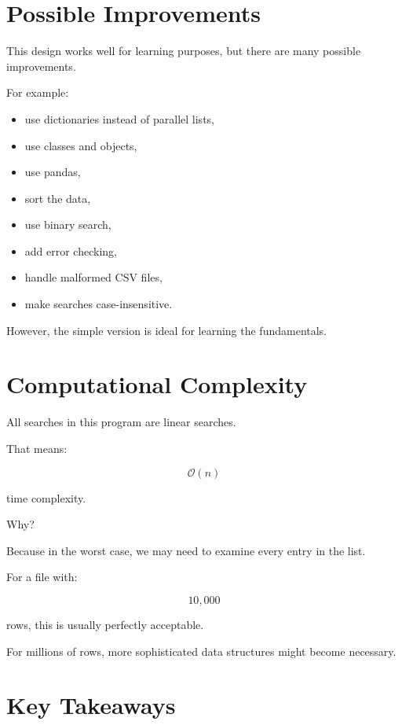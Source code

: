 \documentclass[11pt]{article}
\begin{document}
\section{Possible Improvements}

This design works well for learning purposes, but there are many possible improvements.

For example:

\begin{itemize}
    \item use dictionaries instead of parallel lists,
    \item use classes and objects,
    \item use pandas,
    \item sort the data,
    \item use binary search,
    \item add error checking,
    \item handle malformed CSV files,
    \item make searches case-insensitive.
\end{itemize}

However, the simple version is ideal for learning the fundamentals.

\section{Computational Complexity}

All searches in this program are linear searches.

That means:

\[
\mathcal{O}(n)
\]

time complexity.

Why?

Because in the worst case, we may need to examine every entry in the list.

For a file with:

\[
10{,}000
\]

rows, this is usually perfectly acceptable.

For millions of rows, more sophisticated data structures might become necessary.

\section{Key Takeaways}
\end{document}

